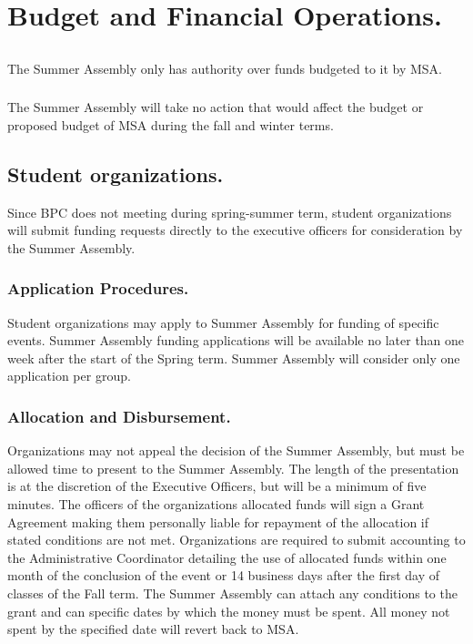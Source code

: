 \section{Budget and Financial Operations.}

\subsection{}
The Summer Assembly only has authority over funds budgeted to it by MSA.
\subsubsection{}
The Summer Assembly will take no action that would affect the budget or
proposed budget of MSA during the fall and winter terms.

\subsection{Student organizations.}
Since BPC does not meeting during spring-summer term,
student organizations will submit funding requests directly to the executive officers for consideration by the Summer Assembly.

\subsubsection{Application Procedures.}
Student organizations may apply to Summer
Assembly for funding of specific events. Summer Assembly funding
applications will be available no later than one week after the start of the
Spring term. Summer Assembly will consider only one application per group.

\subsubsection{Allocation and Disbursement.}
Organizations may not appeal the decision of the Summer Assembly, but must be allowed time to present to the Summer Assembly. The length of the presentation is at the discretion of the Executive Officers, but will be a minimum of five minutes. The officers of the organizations allocated funds will sign a Grant Agreement making them personally liable for repayment of the allocation if stated conditions are not met. Organizations are required to submit accounting to the Administrative Coordinator detailing the use of allocated funds within one month of the conclusion of the event or 14 business days after the first day of classes of the Fall term. The Summer Assembly can attach any conditions to the grant and can specific dates by which the money must be spent. All money not spent by the specified date will revert back to MSA.

